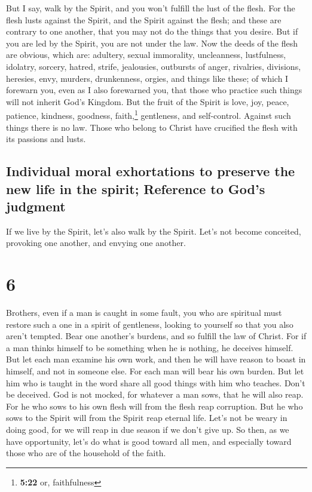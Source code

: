  But I say, walk by the Spirit, and you won't fulfill the
lust of the flesh.  For the flesh lusts against the
Spirit, and the Spirit against the flesh; and these are contrary to one
another, that you may not do the things that you desire. 
But if you are led by the Spirit, you are not under the law.
 Now the deeds of the flesh are obvious, which are:
adultery, sexual immorality, uncleanness, lustfulness, 
idolatry, sorcery, hatred, strife, jealousies, outbursts of anger,
rivalries, divisions, heresies,  envy, murders,
drunkenness, orgies, and things like these; of which I forewarn you,
even as I also forewarned you, that those who practice such things will
not inherit God's Kingdom.  But the fruit of the Spirit
is love, joy, peace, patience, kindness, goodness, faith,\footnote{\textbf{5:22}
  or, faithfulness}  gentleness, and self-control.
Against such things there is no law.  Those who belong to
Christ have crucified the flesh with its passions and lusts.

\hypertarget{individual-moral-exhortations-to-preserve-the-new-life-in-the-spirit-reference-to-gods-judgment}{%
\subsection{Individual moral exhortations to preserve the new life in
the spirit; Reference to God's
judgment}\label{individual-moral-exhortations-to-preserve-the-new-life-in-the-spirit-reference-to-gods-judgment}}

 If we live by the Spirit, let's also walk by the Spirit.
 Let's not become conceited, provoking one another, and
envying one another.

\hypertarget{section-5}{%
\section{6}\label{section-5}}

 Brothers, even if a man is caught in some fault, you who
are spiritual must restore such a one in a spirit of gentleness, looking
to yourself so that you also aren't tempted.  Bear one
another's burdens, and so fulfill the law of Christ.  For
if a man thinks himself to be something when he is nothing, he deceives
himself.  But let each man examine his own work, and then
he will have reason to boast in himself, and not in someone else.
 For each man will bear his own burden.  But
let him who is taught in the word share all good things with him who
teaches.  Don't be deceived. God is not mocked, for
whatever a man sows, that he will also reap.  For he who
sows to his own flesh will from the flesh reap corruption. But he who
sows to the Spirit will from the Spirit reap eternal life.
 Let's not be weary in doing good, for we will reap in due
season if we don't give up.  So then, as we have
opportunity, let's do what is good toward all men, and especially toward
those who are of the household of the faith.

